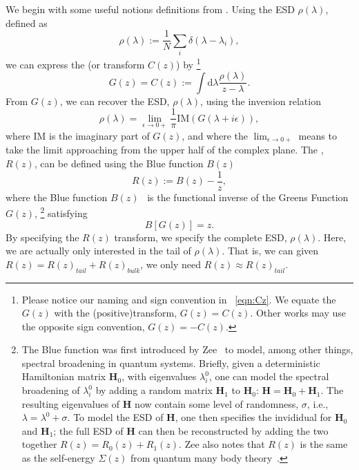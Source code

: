 We begin with some useful notions definitions from \RandomMatrixTheory.
%
Using the ESD $\rho(\lambda)$, defined as
\begin{equation}
\label{eqn:rgo}
\rho(\lambda):=\frac{1}{N}\sum_{i}\delta(\lambda-\lambda_{i})  ,
\end{equation}
%
we can express the \emph{\GreensFunction} (or \emph{\CauchyStieltjes} transform $C(z)$) by%
\footnote{Please notice our naming and sign convention in \EQN~\ref{eqn:Cz}.
We equate the \GreensFunction $G(z)$ with
the (positive)\CauchyStieltjes transform, $G(z)=C(z)$.   Other works may use the opposite sign convention, $G(z)=-C(z)$.}
\begin{equation}
\label{eqn:Cz}
G(z)=C(z):=\int \mathrm{d}\lambda \frac{\rho(\lambda)}{z-\lambda} .
\end{equation}
%
From $G(z)$, we can recover the ESD, $\rho(\lambda)$, using the inversion relation
\begin{equation}
\label{eqn:GzInverse}
\rho(\lambda)=\lim_{\epsilon\rightarrow 0+}\frac{1}{\pi}\mathrm{IM}(G(\lambda+i\epsilon))  ,
\end{equation}
where $\mathrm{IM}$ is the imaginary part of $G(z)$, and where the $\lim_{\epsilon\rightarrow 0+}$ means to take the limit approaching from the upper half of the complex plane.
%
The \RTransform, $R(z)$, can be defined using the Blue function $B(z)$ 
\begin{equation}
\label{eqn:Rz}
R(z):=B(z)-\frac{1}{z}  ,
\end{equation}
where the Blue function $B(z)$~\cite{Zee1996} is the functional inverse of the Greens Function $G(z)$,%
\footnote{The Blue function was first introduced by Zee~\cite{Zee1996} to model, among other things, spectral broadening in quantum systems.
Briefly, given a deterministic Hamiltonian matrix $\mathbf{H}_{0}$, with eigenvalues $\lambda^{0}_{i}$,
one can model the spectral broadening of $\lambda^{0}_{i}$ by adding a random matrix $\mathbf{H}_{1}$ to $\mathbf{H}_{0}$:
$\mathbf{H}=\mathbf{H}_{0}+\mathbf{H}_{1}$.  
The resulting eigenvalues of $\mathbf{H}$ now contain some level of randomness, $\sigma$, i.e., $\lambda=\lambda^{0}+\sigma$.  
To model the ESD of $\mathbf{H}$, one then specifies the invididual \RTransforms for $\mathbf{H}_{0}$ and $\mathbf{H}_{1}$; the full ESD of $\mathbf{H}$
can then be reconstructed by adding the two \RTransforms together $R(z)=R_{0}(z)+R_{1}(z)$.
Zee also notes that $R(z)$  is the same as the self-energy $\Sigma(z)$ from quantum many body theory~\cite{Zee1996}.}
satisfying 
\begin{equation}
\label{eqn:GzRelation}
B[G(z)]=z  .
\end{equation}
By specifying the $R(z)$ transform, we specify the complete ESD, $\rho(\lambda)$.
Here, we are actually only interested in the tail of $\rho(\lambda)$.
That is, we can given $R(z)=R(z)_{tail}+R(z)_{bulk}$, we only need $R(z)\approx R(z)_{tail}$.

